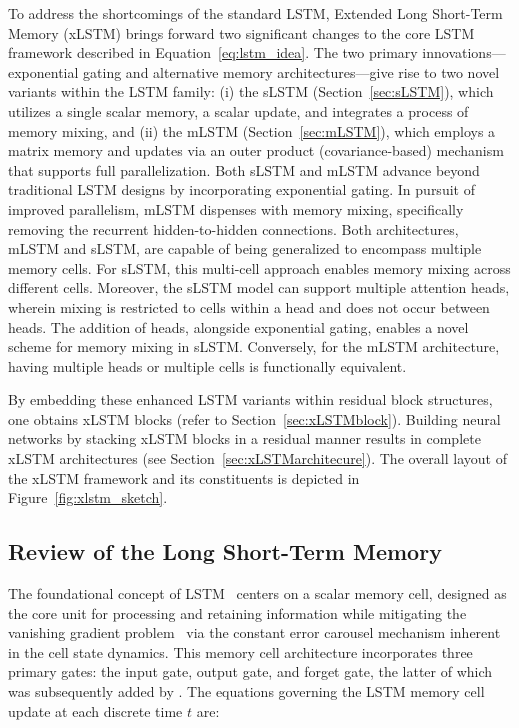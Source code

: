 To address the shortcomings of the standard LSTM, Extended Long Short-Term Memory (xLSTM) brings forward two significant changes to the core LSTM framework described in Equation~\eqref{eq:lstm_idea}. The two primary innovations—exponential gating and alternative memory architectures—give rise to two novel variants within the LSTM family: (i) the sLSTM (Section~\ref{sec:sLSTM}), which utilizes a single scalar memory, a scalar update, and integrates a process of memory mixing, and (ii) the mLSTM (Section~\ref{sec:mLSTM}), which employs a matrix memory and updates via an outer product (covariance-based) mechanism that supports full parallelization. Both sLSTM and mLSTM advance beyond traditional LSTM designs by incorporating exponential gating. In pursuit of improved parallelism, mLSTM dispenses with memory mixing, specifically removing the recurrent hidden-to-hidden connections. Both architectures, mLSTM and sLSTM, are capable of being generalized to encompass multiple memory cells. For sLSTM, this multi-cell approach enables memory mixing across different cells. Moreover, the sLSTM model can support multiple attention heads, wherein mixing is restricted to cells within a head and does not occur between heads. The addition of heads, alongside exponential gating, enables a novel scheme for memory mixing in sLSTM. Conversely, for the mLSTM architecture, having multiple heads or multiple cells is functionally equivalent.

By embedding these enhanced LSTM variants within residual block structures, one obtains xLSTM blocks (refer to Section~\ref{sec:xLSTMblock}). Building neural networks by stacking xLSTM blocks in a residual manner results in complete xLSTM architectures (see Section~\ref{sec:xLSTMarchitecure}). The overall layout of the xLSTM framework and its constituents is depicted in Figure~\ref{fig:xlstm_sketch}.

\subsection{Review of the Long Short-Term Memory}
\label{sec:orgLSTM}

The foundational concept of LSTM~\citep{Hochreiter:91,Hochreiter:97nips,Hochreiter:97} centers on a scalar memory cell, designed as the core unit for processing and retaining information while mitigating the vanishing gradient problem~\citep{Hochreiter:91,Hochreiter:00book} via the constant error carousel mechanism inherent in the cell state dynamics. This memory cell architecture incorporates three primary gates: the input gate, output gate, and forget gate, the latter of which was subsequently added by \citet{Gers:00}. The equations governing the LSTM memory cell update at each discrete time $t$ are:

